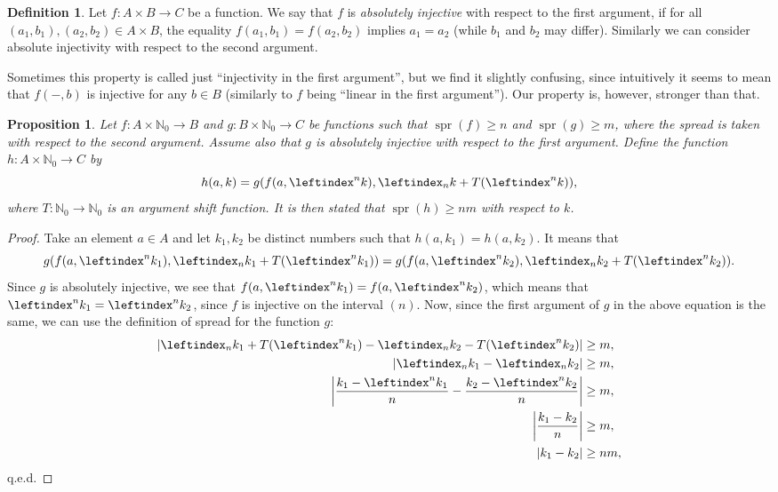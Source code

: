 \documentclass[a4paper, 10pt]{article}
\theoremstyle{plain}
\newtheorem{proposition}[theorem]{Proposition}
\theoremstyle{definition}
\newtheorem{definition}[theorem]{Definition}
\newcommand{\N}{\mathbb{N}}
\newcommand{\li}{\leftindex}
\newcommand{\spr}[1]{\operatorname{spr}(#1)}
\begin{document}
\begin{definition}
  Let $f \colon A \times B \to C$ be a function. We say that $f$ is
  \emph{absolutely injective} with respect to the first argument, if
  for all $(a_1, b_1), (a_2, b_2) \in A \times B$, the equality
  $f(a_1, b_1) = f(a_2, b_2)$ implies $a_1 = a_2$ (while $b_1$ and
  $b_2$ may differ). Similarly we can consider absolute injectivity
  with respect to the second argument.
\end{definition}

Sometimes this property is called just ``injectivity in the first
argument'', but we find it slightly confusing, since intuitively it
seems to mean that $f(-, b)$ is injective for any $b \in B$ (similarly
to $f$ being ``linear in the first argument''). Our property is,
however, stronger than that.\\

\begin{proposition}
  \label{comp}
  Let $f \colon A \times \N_0 \to B$ and $g \colon B \times \N_0 \to
  C$ be functions such that $\spr{f} \ge n$ and $\spr{g} \ge m$, where
  the spread is taken with respect to the second argument. Assume also
  that $g$ is absolutely injective with respect to the first argument.
  Define the function $h \colon A \times \N_0 \to C$ by
  \[
    h(a, k) = g(f(a, \li^n k), \li_n k + T(\li^n k)),
  \]
  where $T \colon \N_0 \to \N_0$ is an argument shift function. It is then stated that $\spr{h} \ge n m$ with respect to $k$.
\end{proposition}
\begin{proof}
  Take an element $a \in A$ and let $k_1, k_2$ be distinct numbers such that $h(a, k_1) = h(a, k_2)$. It means that
  \[
    g(f(a, \li^n k_1), \li_n k_1 + T(\li^n k_1)) = g(f(a, \li^n k_2), \li_n k_2 + T(\li^n k_2)).
  \]
  Since $g$ is absolutely injective, we see that $f(a, \li^n k_1) = f(a, \li^n k_2)$, which means that $\li^n k_1 = \li^n k_2$, since $f$ is injective on the interval $(n)$. Now, since the first argument of $g$ in the above equation is the same, we can use the definition of spread for the function $g$:
  \begin{align*}
    |\li_n k_1 + T(\li^n k_1) - \li_n k_2 - T(\li^n k_2)| &\ge m,\\
    |\li_n k_1 - \li_n k_2| &\ge m,\\
    \left| \frac{k_1 - \li^n k_1}{n} - \frac{k_2 - \li^n k_2}{n} \right| &\ge m,\\
    \left| \frac{k_1 - k_2}{n} \right| &\ge m,\\
    \left| k_1 - k_2 \right| &\ge n m,\\
  \end{align*}
  q.e.d.
\end{proof}
\end{document}
